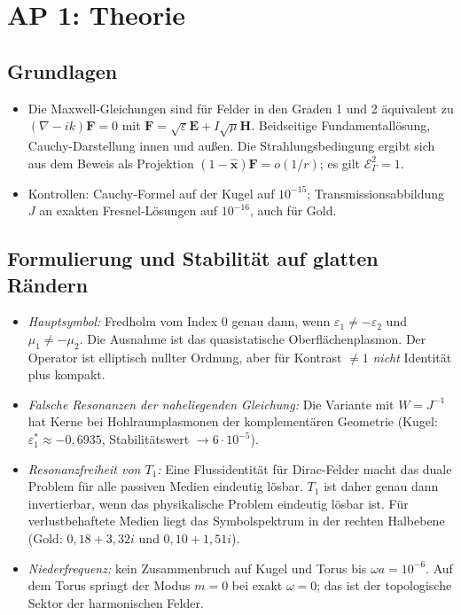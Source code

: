 \documentclass[11pt, a4paper]{article}
\newcommand{\mvec}[1]{\boldsymbol{#1}}
\newcommand{\st}[1]{{\small\sffamily[#1]}}
\begin{document}
\section{AP 1: Theorie}

\subsection{Grundlagen}
\begin{itemize}[leftmargin=*]
  \item Die Maxwell-Gleichungen sind für Felder in den Graden 1 und 2 äquivalent zu
    $(\nabla-ik)\mvec{F}=0$ mit $\mvec{F}=\sqrt\varepsilon\mvec{E}+I\sqrt\mu\mvec{H}$.
    Beidseitige Fundamentallösung, Cauchy-Darstellung innen und außen. Die
    Strahlungsbedingung ergibt sich aus dem Beweis als Projektion
    $(1-\hat{\mvec{x}})\mvec{F}=o(1/r)$; es gilt $\mathcal{E}_\Gamma^2=1$. \st{bewiesen}
  \item Kontrollen: Cauchy-Formel auf der Kugel auf $10^{-15}$; Transmissionsabbildung $J$
    an exakten Fresnel-Lösungen auf $10^{-16}$, auch für Gold. \st{numerisch}
\end{itemize}

\subsection{Formulierung und Stabilität auf glatten Rändern}
\begin{itemize}[leftmargin=*]
  \item \emph{Hauptsymbol:} Fredholm vom Index 0 genau dann, wenn
    $\varepsilon_1\neq-\varepsilon_2$ und $\mu_1\neq-\mu_2$. Die Ausnahme ist das
    quasistatische Oberflächenplasmon. Der Operator ist elliptisch nullter Ordnung, aber
    für Kontrast $\neq1$ \emph{nicht} Identität plus kompakt. \st{bewiesen}
  \item \emph{Falsche Resonanzen der naheliegenden Gleichung:} Die Variante mit
    $W=J^{-1}$ hat Kerne bei Hohlraumplasmonen der komplementären Geometrie (Kugel:
    $\varepsilon_1^*\approx-0{,}6935$, Stabilitätswert $\to6\cdot10^{-5}$). \st{numerisch}
  \item \emph{Resonanzfreiheit von $T_1$:} Eine Flussidentität für Dirac-Felder macht das
    duale Problem für alle passiven Medien eindeutig lösbar. $T_1$ ist daher genau dann
    invertierbar, wenn das physikalische Problem eindeutig lösbar ist. Für
    verlustbehaftete Medien liegt das Symbolspektrum in der rechten Halbebene (Gold:
    $0{,}18+3{,}32i$ und $0{,}10+1{,}51i$). \st{bewiesen}
  \item \emph{Niederfrequenz:} kein Zusammenbruch auf Kugel und Torus bis $\omega a=10^{-6}$.
    Auf dem Torus springt der Modus $m=0$ bei exakt $\omega=0$; das ist der topologische
    Sektor der harmonischen Felder. \st{numerisch}
\end{itemize}
\end{document}
